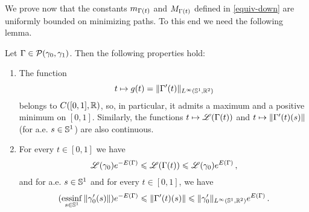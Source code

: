 We prove now that the constants  $m_{\Gamma(t)}$ and $M_{\Gamma(t)}$ defined in \eqref{equiv-down} are uniformly bounded on minimizing paths.
To this end we need the following lemma.

\begin{lem}\label{no-collapse}
Let $\Gamma\in \mathcal{P}(\gamma_0,\gamma_1)$. Then the following properties hold:
\begin{enumerate}
\item The function
$$t\mapsto g(t)= \|\Gamma'(t)\|_{L^\infty(\mathbb{S}^1,\mathbb{R}^2)}$$
belongs to $C([0,1], {\mathbb R})$, so, in particular, it admits a  maximum and a positive minimum on $[0,1]$. Similarly,  the  functions $t\mapsto \mathscr{L}(\Gamma(t))$ and $t\mapsto \|\Gamma'(t)(s)\|$ (for a.e. $s\in \mathbb{S}^1$) are also  continuous. 
\item For every $t\in [0,1]$ we have
\begin{equation}\label{length}
\mathscr{L}(\gamma_0)e^{ -E(\Gamma)} \leqslant \mathscr{L}(\Gamma(t)) \leqslant \mathscr{L}(\gamma_0)e^{E(\Gamma)}\,,
\end{equation}
and for a.e. $s\in \mathbb{S}^1$ and  for every $t\in [0,1]$, we have \begin{equation}\label{length2}	(\underset{s\in \mathbb{S}^1}{\rm{essinf}}\,\|\gamma_0'(s)\|)e^{-  E(\Gamma)}	\leqslant \|\Gamma'(t)(s)\|\leqslant 	\|\gamma_0'\|_{L^{\infty}(\mathbb{S}^1,\mathbb{R}^2)}e^{  E(\Gamma)}\,.\end{equation}

\end{enumerate}
\end{lem}


